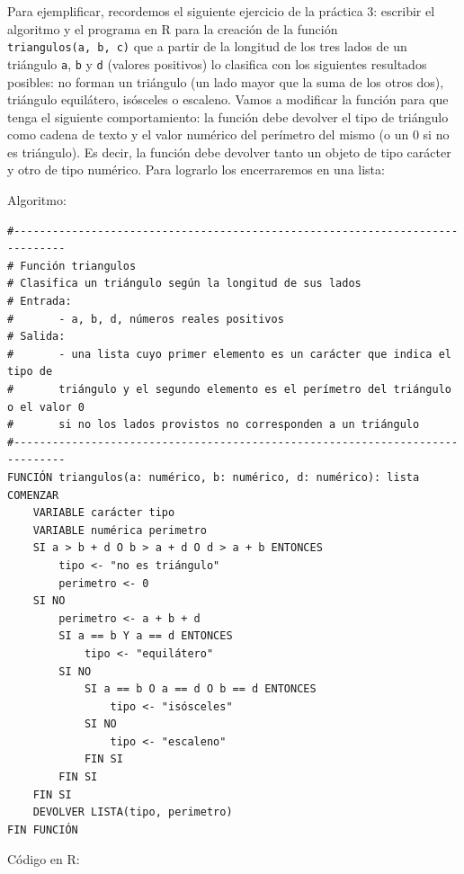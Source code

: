 \documentclass[
]{book}
\begin{document}
Para ejemplificar, recordemos el siguiente ejercicio de la práctica 3: escribir el algoritmo y el programa en R para la creación de la función \texttt{triangulos(a,\ b,\ c)} que a partir de la longitud de los tres lados de un triángulo \texttt{a}, \texttt{b} y \texttt{d} (valores positivos) lo clasifica con los siguientes resultados posibles: no forman un triángulo (un lado mayor que la suma de los otros dos), triángulo equilátero, isósceles o escaleno. Vamos a modificar la función para que tenga el siguiente comportamiento: la función debe devolver el tipo de triángulo como cadena de texto y el valor numérico del perímetro del mismo (o un 0 si no es triángulo). Es decir, la función debe devolver tanto un objeto de tipo carácter y otro de tipo numérico. Para lograrlo los encerraremos en una lista:

Algoritmo:

\begin{verbatim}
#------------------------------------------------------------------------------
# Función triangulos
# Clasifica un triángulo según la longitud de sus lados
# Entrada:
#       - a, b, d, números reales positivos
# Salida:
#       - una lista cuyo primer elemento es un carácter que indica el tipo de
#       triángulo y el segundo elemento es el perímetro del triángulo o el valor 0 
#       si no los lados provistos no corresponden a un triángulo
#------------------------------------------------------------------------------
FUNCIÓN triangulos(a: numérico, b: numérico, d: numérico): lista
COMENZAR
    VARIABLE carácter tipo
    VARIABLE numérica perimetro
    SI a > b + d O b > a + d O d > a + b ENTONCES
        tipo <- "no es triángulo"
        perimetro <- 0
    SI NO
        perimetro <- a + b + d
        SI a == b Y a == d ENTONCES
            tipo <- "equilátero"
        SI NO
            SI a == b O a == d O b == d ENTONCES
                tipo <- "isósceles"
            SI NO
                tipo <- "escaleno"
            FIN SI
        FIN SI
    FIN SI
    DEVOLVER LISTA(tipo, perimetro)
FIN FUNCIÓN
\end{verbatim}

Código en R:
\end{document}

